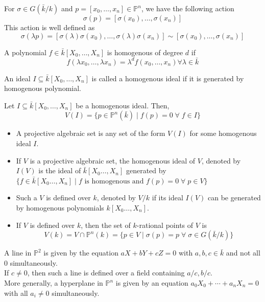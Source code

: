 \documentclass[oneside, 12pt, ]{scrbook}
\theoremstyle{theorem}
\begin{document}
For $\sigma \in G(\bar{k}/k)$ and $p = [x_{0},\hdots ,x_{n}] \in \mathbb{P}^n$, we have the following action $$\sigma(p) = [\sigma(x_{0}),\hdots ,\sigma(x_{n})]$$
This action is well defined as $$\sigma(\lambda p) = [\sigma(\lambda)\sigma(x_{0}),\hdots ,\sigma(\lambda) \sigma(x_{n})] \sim [\sigma(x_{0}),\hdots ,\sigma(x_{n})]$$

\begin{definition}
A polynomial $f \in \bar{k}[X_{0}, \hdots , X_{n}]$ is homogenous of degree $d$ if $$f(\lambda x_{0} , \hdots , \lambda x_{n})  = \lambda^d f(x_{0} , \hdots ,x_{n}) \forall \lambda \in \bar{k}$$
\end{definition}

\begin{definition}
An ideal $I \subseteq \bar{k}[X_{0} , \hdots , X_{n}]$ is called a homogenous ideal if it is generated by homogenous polynomial.  
\end{definition}

\begin{definition}
Let $I \subseteq \bar{k}[X_{0} , \hdots , X_{n}]$ be a homogenous ideal. Then, $$V(I) = \{p \in \mathbb{P}^n (\bar{k}) \mid f(p)=0 \; \forall \; f\in I\}$$
\end{definition}

\begin{definition}
\begin{itemize}
\item A projective algebraic set is any set of the form $V(I)$ for some homogenous ideal $I$. 
\item If $V$ is a projective algebraic set, the homogenous ideal of $V$, denoted by $I(V)$ is the ideal of $\bar{k}[X_{0} \hdots , X_{n}]$ generated by $\{f \in \bar{k}[X_{0} \hdots , X_{n}]\mid f \text{ is homogenous and }f(p)= 0 \; \forall \; p\in V\}$
\item Such a $V$ is defined over $k$, denoted by $V/k$ if its ideal $I(V)$ can be generated by homogenous polynomials $k[X_{0} \hdots , X_{n}]$. 
\item If $V$ is defined over $k$, then the set of $k$-rational points of $V$ is $$V(k) = V \cap \mathbb{P}^{n}(k) = \{p \in V \mid \sigma(p)=p \; \forall \; \sigma \in G(\bar{k}/k)\}$$
\end{itemize}
\end{definition}

\begin{example}
A line in $\mathbb{P}^2$ is given by the equation $aX + bY + cZ=0$ with $a,b,c \in \bar{k}$ and not all $0$ simultaneously. \\
If $c\neq 0$, then such a line is defined over a field containing $a/c, b/c$. \\
More generally, a hyperplane in $\mathbb{P}^n$ is given by an equation $a_{0}X_{0} + \cdots + a_{n}X_{n} = 0$ with all $a_{i} \neq 0$ simultaneously.
\end{example}
\end{document}
